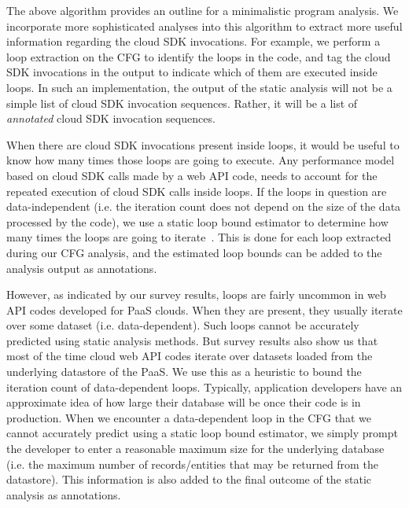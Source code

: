 The above algorithm provides an outline for a minimalistic program analysis.
We incorporate more sophisticated analyses into this algorithm to extract more
useful information regarding the cloud SDK invocations. For example, we perform a loop extraction on the
CFG to identify the loops in the code, and tag the cloud SDK invocations in the output to indicate which of them
are executed inside loops. In such an implementation, the output of the static analysis will not be a simple
list of cloud SDK invocation sequences. Rather, it will be a list of \textit{annotated} cloud SDK invocation sequences.

When there are cloud SDK invocations present inside loops, it would be useful to know how many times those loops
are going to execute. Any performance model based on cloud SDK calls made by a web API code,
needs to account for the repeated execution of cloud SDK calls inside loops. If the 
loops in question are data-independent (i.e. the iteration count does not depend on the size of the data processed 
by the code), we use a static loop bound estimator to determine how many times the loops are going to iterate~\cite{bygde2010static,Gulwani:2009:CRP:1542476.1542518,Lokuciejewski:2009:FPS:1545006.1545064,Hunt:2006:PCL:1167999.1168026}.
This is done for each loop extracted during our CFG analysis, and the estimated loop bounds can be added to the
analysis output as annotations.

However, as indicated by our survey results, loops are fairly uncommon in web API codes developed for PaaS clouds. When
they are present, they usually iterate over some dataset (i.e. data-dependent). Such loops cannot
be accurately predicted using static analysis methods. But survey results also show us that
most of the time cloud web API codes iterate over datasets loaded from the underlying datastore of the PaaS.
We use this as a heuristic to bound the iteration count of data-dependent loops. Typically, application developers
have an approximate idea of how large their database will be once their code is in production. When we encounter a data-dependent
loop in the CFG that we cannot accurately predict using a static loop bound estimator, we simply
prompt the developer to enter a reasonable maximum size for the underlying database (i.e. the maximum number of
records/entities that may be returned from the datastore). 
This information is also added to the final outcome of the static analysis as annotations.

